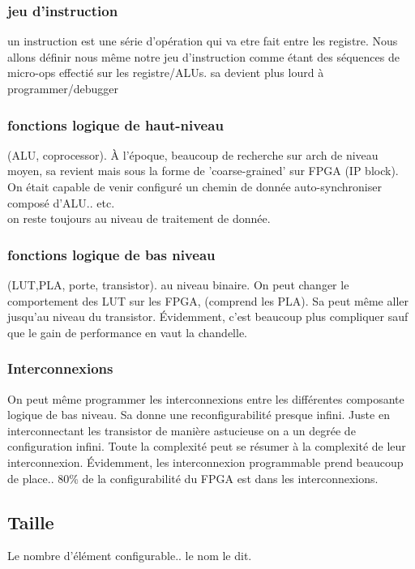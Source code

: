 \documentclass[oneside]{book}
\begin{document}
        \subsubsection{jeu d'instruction}
        un instruction est une série d'opération qui va etre fait entre les registre. Nous allons définir nous même notre jeu d'instruction comme étant des séquences de micro-ops effectié sur les registre/ALUs. sa devient plus lourd à programmer/debugger
        
        \subsubsection{fonctions logique de haut-niveau}
        (ALU, coprocessor). À l'époque, beaucoup de recherche sur arch de niveau moyen, sa revient mais sous la forme de 'coarse-grained' sur FPGA (IP block). On était capable de venir configuré un chemin de donnée auto-synchroniser composé d'ALU.. etc.\\
       
        on reste toujours au niveau de traitement de donnée.
        \subsubsection{fonctions logique de bas niveau}
        (LUT,PLA, porte, transistor). au niveau binaire. On peut changer le comportement des LUT sur les FPGA, (comprend les PLA). Sa peut même aller jusqu'au niveau du transistor. Évidemment, c'est beaucoup plus compliquer sauf que le gain de performance en vaut la chandelle.\\
        
        \subsubsection{Interconnexions}
        On peut même programmer les interconnexions entre les différentes composante logique de bas niveau. Sa donne une reconfigurabilité presque infini. Juste en interconnectant les transistor de manière astucieuse on a un degrée de configuration infini. Toute la complexité peut se résumer à la complexité de leur interconnexion.  Évidemment, les interconnexion programmable prend beaucoup de place.. 80\% de la configurabilité du FPGA est dans les interconnexions.\\
        
        \subsection{Taille}
        Le nombre d'élément configurable.. le nom le dit.\\
        
\end{document}

